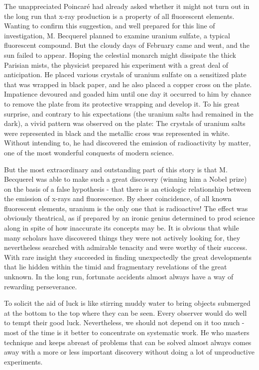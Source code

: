 \documentclass{article}
\begin{document}
The unappreciated Poincaré had already asked whether it might not turn out in the long run that x-ray production is a property of all fluorescent elements. Wanting to confirm this suggestion, and well prepared for this line of investigation, M. Becquerel planned to examine uranium sulfate, a typical fluorescent compound. But the cloudy days of February came and went, and the sun failed to appear. Hoping the celestial monarch might dissipate the thick Parisian mists, the physicist prepared his experiment with a great deal of anticipation. He placed various crystals of uranium sulfate on a sensitized plate that was wrapped in black paper, and he also placed a copper cross on the plate. Impatience devoured and goaded him until one day it occurred to him by chance to remove the plate from its protective wrapping and develop it. To his great surprise, and contrary to his expectations (the uranium salts had remained in the dark), a vivid pattern was observed on the plate: The crystals of uranium salts were represented in black and the metallic cross was represented in white. Without intending to, he had discovered the emission of radioactivity by matter, one of the most wonderful conquests of modern science.

But the most extraordinary and outstanding part of this story is that M. Becquerel was able to make such a great discovery (winning him a Nobel prize) on the basis of a false hypothesis - that there is an etiologic relationship between the emission of x-rays and fluorescence. By sheer coincidence, of all known fluorescent elements, uranium is the only one that is radioactive! The effect was obviously theatrical, as if prepared by an ironic genius determined to prod science along in spite of how inaccurate its concepts may be. It is obvious that while many scholars have discovered things they were not actively looking for, they nevertheless searched with admirable tenacity and were worthy of their success. With rare insight they succeeded in finding unexpectedly the great developments that lie hidden within the timid and fragmentary revelations of the great unknown. In the long run, fortunate accidents almost always have a way of rewarding perseverance.

To solicit the aid of luck is like stirring muddy water to bring objects submerged at the bottom to the top where they can be seen. Every observer would do well to tempt their good luck. Nevertheless, we should not depend on it too much - most of the time is it better to concentrate on systematic work. He who masters technique and keeps abreast of problems that can be solved almost always comes away with a more or less important discovery without doing a lot of unproductive experiments.
\end{document}
